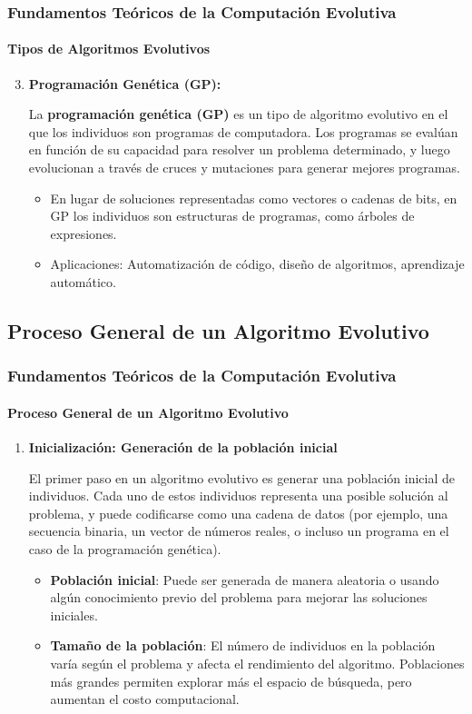 \documentclass[
	11pt, %
]{beamer}
\begin{document}
\begin{frame}
    \frametitle{Fundamentos Teóricos de la Computación Evolutiva}
    \framesubtitle{Tipos de Algoritmos Evolutivos}
    \begin{enumerate}
    \setcounter{enumi}{2}
        \item \textbf{Programación Genética (GP):}
        
        La \textbf{programación genética (GP)} es un tipo de algoritmo evolutivo en el que los individuos son programas de computadora. Los programas se evalúan en función de su capacidad para resolver un problema determinado, y luego evolucionan a través de cruces y mutaciones para generar mejores programas.
        
        \begin{itemize}
            \item En lugar de soluciones representadas como vectores o cadenas de bits, en GP los individuos son estructuras de programas, como árboles de expresiones.
            \item Aplicaciones: Automatización de código, diseño de algoritmos, aprendizaje automático.
        \end{itemize}
    \end{enumerate}
\end{frame}
\subsection{Proceso General de un Algoritmo Evolutivo}
\begin{frame}
    \frametitle{Fundamentos Teóricos de la Computación Evolutiva}
    \framesubtitle{Proceso General de un Algoritmo Evolutivo}
    \begin{enumerate}
        \item \textbf{Inicialización: Generación de la población inicial}
        
        El primer paso en un algoritmo evolutivo es generar una población inicial de individuos. Cada uno de estos individuos representa una posible solución al problema, y puede codificarse como una cadena de datos (por ejemplo, una secuencia binaria, un vector de números reales, o incluso un programa en el caso de la programación genética).
        
        \begin{itemize}
            \item \textbf{Población inicial}: Puede ser generada de manera aleatoria o usando algún conocimiento previo del problema para mejorar las soluciones iniciales.
            \item \textbf{Tamaño de la población}: El número de individuos en la población varía según el problema y afecta el rendimiento del algoritmo. Poblaciones más grandes permiten explorar más el espacio de búsqueda, pero aumentan el costo computacional.
        \end{itemize}
    \end{enumerate}
\end{frame}
\end{document}

